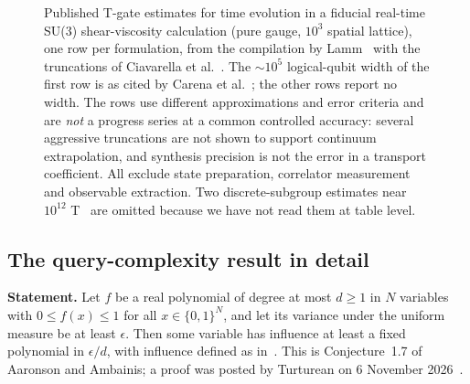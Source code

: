 \documentclass[10pt,a4paper]{article}
\begin{document}
\begin{figure}[htbp]
\centering
{}
\caption[Lattice gauge theory estimates by formulation]{Published T-gate estimates for time evolution in a fiducial real-time SU(3) shear-viscosity calculation (pure gauge, $10^3$ spatial lattice), one row per formulation, from the compilation by Lamm~\cite{lamm2026} with the truncations of Ciavarella et al.~\cite{ciavarella2025}. The $\sim10^5$ logical-qubit width of the first row is as cited by Carena et al.~\cite{carena2022}; the other rows report no width. The rows use different approximations and error criteria and are \emph{not} a progress series at a common controlled accuracy: several aggressive truncations are not shown to support continuum extrapolation, and synthesis precision is not the error in a transport coefficient. All exclude state preparation, correlator measurement and observable extraction. Two discrete-subgroup estimates near $10^{12}$ T~\cite{lamm2026,osorio2025} are omitted because we have not read them at table level.}
\label{fig:lgt}
\end{figure}

\subsection{The query-complexity result in detail}
\label{app:query}
\textbf{Statement.} Let $f$ be a real polynomial of degree at most $d\ge1$ in $N$ variables with $0\le f(x)\le1$ for all $x\in\{0,1\}^N$, and let its variance under the uniform measure be at least $\epsilon$. Then some variable has influence at least a fixed polynomial in $\epsilon/d$, with influence defined as in~\cite{aa2014}. This is Conjecture~1.7 of Aaronson and Ambainis; a proof was posted by Turturean on 6 November 2026~\cite{turturean2026,psi2026}.
\end{document}
